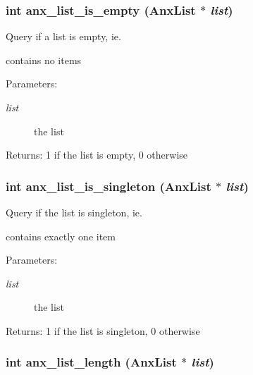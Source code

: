\subsubsection{\setlength{\rightskip}{0pt plus 5cm}int anx\_\-list\_\-is\_\-empty ({\bf Anx\-List} $\ast$ {\em list})}\label{anx__list_8h_a12}


Query if a list is empty, ie. 

contains no items \begin{Desc}
\item[Parameters:]
\begin{description}
\item[{\em list}]the list \end{description}
\end{Desc}
\begin{Desc}
\item[Returns:]1 if the list is empty, 0 otherwise \end{Desc}
\subsubsection{\setlength{\rightskip}{0pt plus 5cm}int anx\_\-list\_\-is\_\-singleton ({\bf Anx\-List} $\ast$ {\em list})}\label{anx__list_8h_a13}


Query if the list is singleton, ie. 

contains exactly one item \begin{Desc}
\item[Parameters:]
\begin{description}
\item[{\em list}]the list \end{description}
\end{Desc}
\begin{Desc}
\item[Returns:]1 if the list is singleton, 0 otherwise \end{Desc}
\subsubsection{\setlength{\rightskip}{0pt plus 5cm}int anx\_\-list\_\-length ({\bf Anx\-List} $\ast$ {\em list})}\label{anx__list_8h_a11}


